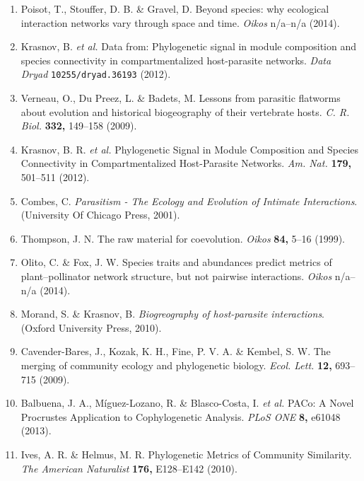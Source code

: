 \documentclass{nature}
\begin{document}
\begin{enumerate}
\item Poisot, T., Stouffer, D. B. \& Gravel, D. Beyond
species: why ecological interaction networks vary through space and
time. \emph{Oikos} n/a--n/a (2014).

\item Krasnov, B. \emph{et al.} Data from: Phylogenetic signal in module
composition and species connectivity in compartmentalized host-parasite
networks. \emph{Data Dryad} \texttt{10255/dryad.36193} (2012).

\item Verneau, O., Du Preez, L. \& Badets, M. Lessons from
parasitic flatworms about evolution and historical biogeography of their
vertebrate hosts. \emph{C. R. Biol.} \textbf{332,} 149--158 (2009).

\item Krasnov, B. R. \emph{et al.} Phylogenetic Signal in Module
Composition and Species Connectivity in Compartmentalized Host-Parasite
Networks. \emph{Am. Nat.} \textbf{179,} 501--511 (2012).

\item Combes, C. \emph{Parasitism - The Ecology and Evolution
of Intimate Interactions}. (University Of Chicago Press, 2001).

\item Thompson, J. N. The raw material for coevolution.
\emph{Oikos} \textbf{84,} 5--16 (1999).

\item Olito, C. \& Fox, J. W. Species traits and abundances
predict metrics of plant--pollinator network structure, but not pairwise
interactions. \emph{Oikos} n/a--n/a (2014).

\item Morand, S. \& Krasnov, B. \emph{Biogreography of host-parasite
interactions}. (Oxford University Press, 2010).

\item Cavender-Bares, J., Kozak, K. H., Fine, P. V. A. \& Kembel, S.
W. The merging of community ecology and phylogenetic
biology. \emph{Ecol. Lett.} \textbf{12,} 693--715 (2009).

\item Balbuena, J. A., Míguez-Lozano, R. \& Blasco-Costa, I. \emph{et al.}
PACo: A Novel Procrustes Application to Cophylogenetic Analysis.
\emph{PLoS ONE} \textbf{8,} e61048 (2013).

\item Ives, A. R. \& Helmus, M. R. Phylogenetic Metrics of
Community Similarity. \emph{The American Naturalist} \textbf{176,}
E128--E142 (2010).

\end{enumerate}
\end{document}
